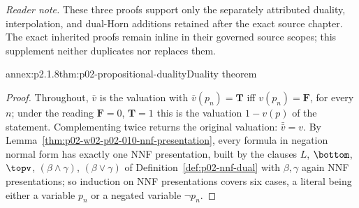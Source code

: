 \noindent\textit{Reader note.} These three proofs support only the separately
attributed duality, interpolation, and dual-Horn additions retained after the exact
source chapter.  The exact inherited proofs remain inline in their governed
source scopes; this supplement neither duplicates nor replaces them.

\begin{annexitem}{annex:p2.1.8}{thm:p02-propositional-duality}{Duality theorem}
\begin{proof}
Throughout, \(\bar v\) is the valuation with \(\bar v(p_n)=\mathbf T\) iff
\(v(p_n)=\mathbf F\), for every \(n\); under the reading
\(\mathbf F=0\), \(\mathbf T=1\) this is the valuation \(1-v(p)\) of the
statement.  Complementing twice returns the original valuation:
\(\bar{\bar v}=v\).  By
Lemma~\ref{thm:p02-w02-p02-010-nnf-presentation}, every formula in negation
normal form has exactly one NNF presentation, built by the clauses
\(L\), \(\bottom\), \(\topv\), \((\beta\land\gamma)\), \((\beta\lor\gamma)\)
of Definition~\ref{def:p02-nnf-dual} with \(\beta,\gamma\) again NNF
presentations; so induction on NNF presentations covers six cases, a literal
being either a variable \(p_n\) or a negated variable \(\neg p_n\).


\end{proof}
\end{annexitem}
